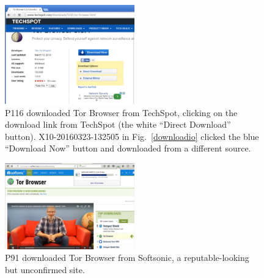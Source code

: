 \documentclass[USenglish,oneside,twocolumn]{article}
\begin{document}
\begin{figure}[h]
\includegraphics[width=0.5\textwidth]{../experiment/processing/bad-participants/20160323-133257-techspot.png}
\caption{P116 downloaded Tor Browser from TechSpot, clicking on the download link from 
TechSpot (the white ``Direct Download'' button). X10-20160323-132505 in Fig.~\ref{downloadio} clicked the blue ``Download Now'' button and downloaded from a different source.}
\label{techspot}
\end{figure}

\begin{figure}[h]
\includegraphics[width=0.5\textwidth]{../experiment/processing/bad-participants/20160330-161511-softsonic.png}
\caption{P91 downloaded Tor Browser from Softsonic, a reputable-looking but
unconfirmed site.}
\label{softsonic}
\end{figure}
\end{document}
